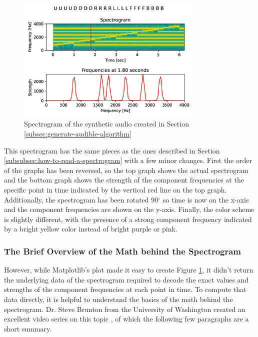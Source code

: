 \begin{figure}[h]
    \centering
    \caption{Spectrogram of the synthetic audio created in Section \ref{subsec:generate-audible-algorithm}}
    \label{fig:spectrogram}
    \includegraphics[width=0.8\textwidth]{Figures/5 Algorithm Design/component_frequencies.png}
\end{figure}

This spectrogram has the same pieces as the ones described in Section
\ref{subsubsec:how-to-read-a-spectrogram} with a few minor changes.
First the order of the graphs has been reversed, so the top graph shows
the actual spectrogram and the bottom graph shows the strength of the
component frequencies at the specific point in time indicated by the
vertical red line on the top graph. Additionally, the spectrogram has
been rotated 90$^\circ$ so time is now on the x-axis and the component
frequencies are shown on the y-axis. Finally, the color scheme is
slightly different, with the presence of a strong component frequency
indicated by a bright yellow color instead of bright purple or pink.

\subsubsection{The Brief Overview of the Math behind the Spectrogram}

However, while Matplotlib's  plot \cite{matplotlib} made
it easy to create Figure \ref{fig:spectrogram}, it didn't return the
underlying data of the spectrogram required to decode the exact values
and strengths of the component frequencies at each point in time. To
compute that data directly, it is helpful to understand the basics of
the math behind the spectrogram. Dr. Steve Brunton from the University
of Washington created an excellent video series on this topic
\cite{fourier-analysis}, of which the following few paragraphs are a
short summary.

